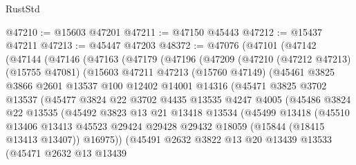 \begin{lexlean}{RustStd}
\begin{coremodule}
@47210 := @15603 @47201
@47211 := @47150 @45443
@47212 := @15437 @47211
@47213 := @45447 @47203
@48372 := @47076
    (@47101
      (@47142
        (@47144
          (@47146
            (@47163
              (@47179
                (@47196
                  (@47209
                    (@47210
                      (@47212 @47213)
                      (@15755 @47081)
                      (@15603
                        @47211
                        @47213
                        (@15760 @47149)
                        (@45461
                          @3825
                          @3866
                          @2601
                          @13537
                          @100
                          @12402
                          @14001
                          @14316
                          (@45471
                            @3825
                            @3702
                            @13537
                            (@45477
                              @3824
                              @22
                              @3702
                              @4435
                              @13535
                              @4247
                              @4005
                              (@45486
                                @3824
                                @22
                                @13535
                                (@45492
                                  @3823
                                  @13
                                  @21
                                  @13418
                                  @13534
                                  (@45499
                                    @13418
                                    (@45510
                                      @13406
                                      @13413
                                      @45523
                                      @29424
                                      @29428
                                      @29432
                                      @18059
                                      (@15844 (@18415 @13413 @13407))
                                      @16975))
                                  (@45491
                                    @2632
                                    @3822
                                    @13
                                    @20
                                    @13439
                                    @13533
                                    (@45471
                                      @2632
                                      @13
                                      @13439

\end{coremodule}
\end{lexlean}
